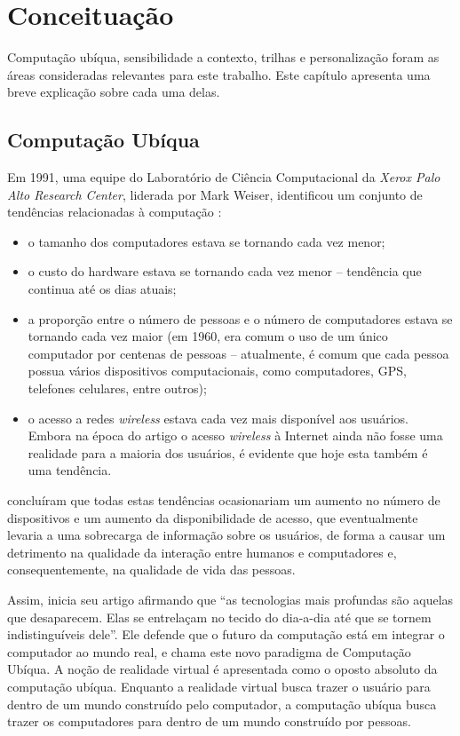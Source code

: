 \chapter{Conceituação}
\label{ch:conceitos}

Computação ubíqua, sensibilidade a contexto, trilhas e personalização foram as áreas consideradas relevantes para este trabalho. Este capítulo apresenta uma breve explicação sobre cada uma delas.


\section{Computação Ubíqua}
\label{sec:ubicomp}

Em 1991, uma equipe do Laboratório de Ciência Computacional da {\em Xerox Palo Alto Research Center}, liderada por Mark Weiser, identificou um conjunto de tendências relacionadas à computação \cite{weiser91}:

\begin{itemize}
  \item o tamanho dos computadores estava se tornando cada vez menor;
  \item o custo do hardware estava se tornando cada vez menor -- tendência que continua até os dias atuais;
  \item a proporção entre o número de pessoas e o número de computadores estava se tornando cada vez maior (em 1960, era comum o uso de um único computador por centenas de pessoas -- atualmente, é comum que cada pessoa possua vários dispositivos computacionais, como computadores, GPS, telefones celulares, entre outros);
  \item o acesso a redes {\em wireless} estava cada vez mais disponível aos usuários. Embora na época do artigo o acesso {\em wireless} à Internet ainda não fosse uma realidade para a maioria dos usuários, é evidente que hoje esta também é uma tendência.
\end{itemize}

 concluíram que todas estas tendências ocasionariam um aumento no número de dispositivos e um aumento da disponibilidade de acesso, que eventualmente levaria a uma sobrecarga de informação sobre os usuários, de forma a causar um detrimento na qualidade da interação entre humanos e computadores e, consequentemente, na qualidade de vida das pessoas.

Assim,  inicia seu artigo afirmando que ``as tecnologias mais profundas são aquelas que desaparecem. Elas se entrelaçam no tecido do dia-a-dia até que se tornem indistinguíveis dele''. Ele defende que o futuro da computação está em integrar o computador ao mundo real, e chama este novo paradigma de Computação Ubíqua. A noção de realidade virtual é apresentada como o oposto absoluto da computação ubíqua. Enquanto a realidade virtual busca trazer o usuário para dentro de um mundo construído pelo computador, a computação ubíqua busca trazer os computadores para dentro de um mundo construído por pessoas.

